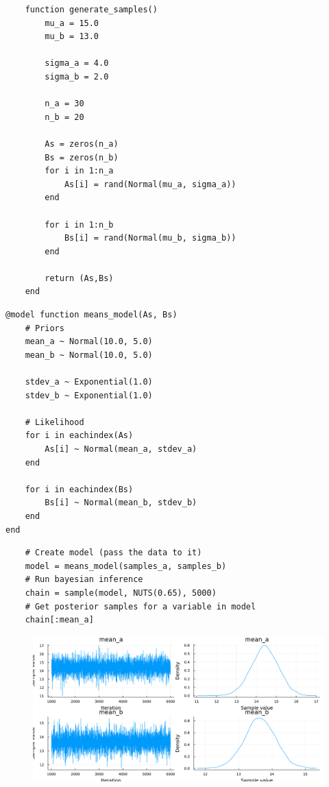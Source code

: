 \documentclass[aspectratio=169,xcolor=svgnames]{beamer}
\begin{document}
\newcommand{\normal}[1]{\text{Normal}(#1)}
\newcommand{\exponential}[1]{\text{Exponential}(#1)}

\begin{frame}[fragile]
    \begin{verbatim}
    function generate_samples()
        mu_a = 15.0
        mu_b = 13.0

        sigma_a = 4.0
        sigma_b = 2.0

        n_a = 30
        n_b = 20

        As = zeros(n_a)
        Bs = zeros(n_b)
        for i in 1:n_a
            As[i] = rand(Normal(mu_a, sigma_a))
        end

        for i in 1:n_b
            Bs[i] = rand(Normal(mu_b, sigma_b))
        end

        return (As,Bs)
    end
    \end{verbatim}
\end{frame}



\begin{frame}[fragile]
  \begin{verbatim}
@model function means_model(As, Bs)
    # Priors
    mean_a ~ Normal(10.0, 5.0)
    mean_b ~ Normal(10.0, 5.0)

    stdev_a ~ Exponential(1.0)
    stdev_b ~ Exponential(1.0)

    # Likelihood
    for i in eachindex(As)
        As[i] ~ Normal(mean_a, stdev_a)
    end

    for i in eachindex(Bs)
        Bs[i] ~ Normal(mean_b, stdev_b)
    end
end
  \end{verbatim}
\end{frame}

\begin{frame}[fragile]
  \begin{verbatim}
    # Create model (pass the data to it)
    model = means_model(samples_a, samples_b)
    # Run bayesian inference
    chain = sample(model, NUTS(0.65), 5000)
    # Get posterior samples for a variable in model
    chain[:mean_a]
  \end{verbatim}
\end{frame}

\begin{frame}
  \begin{figure}[ht]
    \centering
    \includegraphics[height=0.7\textheight]{figures/chain_mean.pdf}
  \end{figure}
\end{frame}
\end{document}
